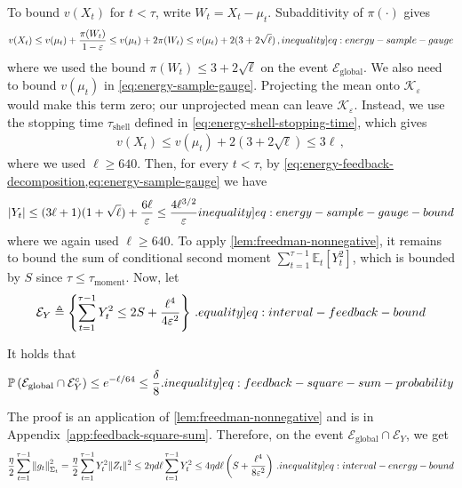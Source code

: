 \documentclass[12pt,cleveref]{jmlr}
\newcommand{\eqlabel}[1]{\label[equality]{#1}}
\newcommand{\ineqlabel}[1]{\label[inequality]{#1}}
\newcommand{\E}{\mathbb E}
\newcommand{\Pp}{\mathbb P}
\newcommand{\K}{\mathcal K}
\newcommand{\1}{\mathbf 1}
\newcommand{\eps}{\varepsilon}
\newcommand{\normm}[2]{\left\lVert #1\right\rVert_{#2}}
\newcommand{\alireza}[1]{\todo[color=blue!20,size=\tiny]{Alireza: #1}}
\begin{document}
To bound $v(X_t)$ for $t < \tau$, write $W_t=X_t-\mu_t$.
Subadditivity of $\pi(\cdot)$ gives
\begin{align}
    v(X_t)\leq v(\mu_t)+\frac{\pi(W_t)}{1-\eps}
    \leq v(\mu_t)+2\pi(W_t)
    \leq v(\mu_t)+2(3 + 2\sqrt\ell)
    \,,
    \ineqlabel{eq:energy-sample-gauge}
\end{align}
where we used the bound $\pi(W_t)\leq 3 + 2\sqrt\ell$ on the event $\mathcal E_{\mathrm{global}}$.
We also need to bound $v(\mu_t)$ in \cref{eq:energy-sample-gauge}.
Projecting the mean onto $\K_\eps$ would make this term zero; our unprojected mean can leave $\K_\eps$.
Instead, we use the stopping time $\tau_{\mathrm{shell}}$ defined in \cref{eq:energy-shell-stopping-time},
which gives
\begin{align}
    v(X_t)
    \leq v(\mu_t) + 2(3 + 2\sqrt\ell)
    \leq 3\ell\,,
\end{align}
where we used $\ell \geq 640$.
Then, for every $t < \tau$, by \cref{eq:energy-feedback-decomposition,eq:energy-sample-gauge} we have
\begin{align}
    |Y_t|
    \leq (3\ell + 1)(1+\sqrt\ell)+\frac{6\ell}{\eps}
    \leq \frac{4\ell^{3/2}}{\eps}
    \ineqlabel{eq:energy-sample-gauge-bound}
\end{align}
where we again used $\ell\geq640$.
To apply \cref{lem:freedman-nonnegative}, it remains to bound the sum of conditional second moment $\sum_{t=1}^{\tau-1}\E_t[Y_t^2]$,
which is bounded by $S$ since $\tau \leq \tau_{\mathrm{moment}}$.
Now, let
\begin{align}
    \mathcal E_Y
    \triangleq
    \left\{
        \sum_{t=1}^{\tau-1}Y_t^2
        \leq
        2S + \frac{\ell^4}{4\eps^2}
    \right\}\,.
    \eqlabel{eq:interval-feedback-bound}
\end{align}
\begin{lemma}
    \label{lem:feedback-square-sum}
    It holds that
    \alireza{Double check.}
    \begin{align}
        \Pp\left(\mathcal E_{\mathrm{global}}\cap\mathcal E_Y^c\right)
        \leq e^{-\ell/64}\leq\frac\delta8.
        \ineqlabel{eq:feedback-square-sum-probability}
    \end{align}
\end{lemma}
The proof is an application of \cref{lem:freedman-nonnegative} and is
in Appendix~\ref{app:feedback-square-sum}.
Therefore, on the event $\mathcal E_\mathrm{global} \cap \mathcal E_Y$, we get
\begin{align}
    \frac{\eta}{2}\sum_{t=1}^{\tau-1}\normm{g_t}{\Sigma_t}^2
    =
    \frac{\eta}{2}\sum_{t=1}^{\tau-1}Y_t^2\|Z_t\|^2
    \leq
    2\eta d\ell
    \sum_{t=1}^{\tau-1}Y_t^2
    \leq
    4\eta d\ell
    \left(
        S + \frac{\ell^4}{8\eps^2}
    \right)\,.
    \ineqlabel{eq:interval-energy-bound}
\end{align}
\end{document}
